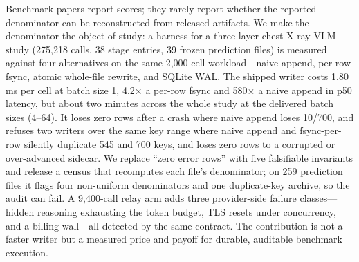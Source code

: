
Benchmark papers report scores; they rarely report whether the reported
denominator can be reconstructed from released artifacts. We make the
denominator the object of study: a harness for a three-layer chest X-ray VLM
study (275,218 calls, 38 stage entries, 39 frozen prediction files) is measured
against four alternatives on the same 2,000-cell workload---naive append,
per-row fsync, atomic whole-file rewrite, and SQLite WAL. The shipped writer
costs 1.80\,ms per cell at batch size 1, 4.2$\times$ a per-row fsync and 580$\times$ a naive
append in p50 latency, but about two minutes across the whole study at the delivered
batch sizes (4--64). It loses zero rows after a crash where naive append loses 10/700, and
refuses two writers over the same key range where naive append and fsync-per-row silently duplicate 545
and 700 keys, and loses zero rows to a corrupted or over-advanced sidecar. We replace ``zero error
rows'' with five falsifiable invariants and release a census that recomputes each
file's denominator; on 259 prediction files it flags four non-uniform
denominators and one duplicate-key archive, so the audit can fail. A 9,400-call
relay arm adds three provider-side failure classes---hidden reasoning exhausting
the token budget, TLS resets under concurrency, and a billing wall---all detected
by the same contract. The contribution is not a faster writer but a measured
price and payoff for durable, auditable benchmark execution.
